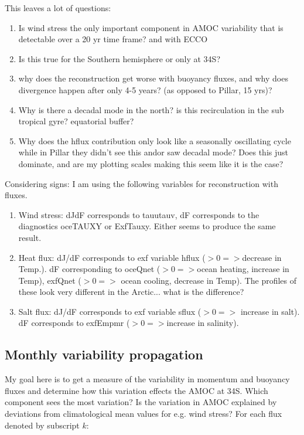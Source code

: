 \documentclass[a4paper,11pt]{article}
\begin{document}
  This leaves a lot of questions: 
  \begin{enumerate}
	\item Is wind stress the only important component in AMOC variability that is detectable over a 20 yr time frame? and with ECCO
	\item Is this true for the Southern hemisphere or only at 34S? 
	\item why does the reconstruction get worse with buoyancy fluxes, and why does divergence happen after only 4-5 years? (as opposed to Pillar, 15 yrs)?
	\item Why is there a decadal mode in the north? is this recirculation in the sub tropical gyre? equatorial buffer? 
	\item Why does the hflux contribution only look like a seasonally oscillating cycle while in Pillar they didn't see this andor saw decadal mode? Does this just dominate, and are my plotting scales making this seem like it is the case? 
 \end{enumerate}

  Considering signs: I am using the following variables for reconstruction with fluxes. 
  \begin{enumerate}
	\item Wind stress: dJdF corresponds to tauutauv, dF corresponds to the diagnostics oceTAUXY or ExfTauxy. Either seems to produce the same result. 
	\item Heat flux: dJ/dF corresponds to exf variable hflux ($>0 => $decrease in Temp.). dF corresponding to oceQnet ($>0 => $ocean heating, increase in Temp), exfQnet ($>0 =>$ ocean cooling, decrease in Temp). The profiles of these look very different in the Arctic... what is the difference? 
	\item Salt flux: dJ/dF corresponds to exf variable sflux ($>0 =>$ increase in salt). dF corresponds to exfEmpmr ($>0 => $increase in salinity). 
  \end{enumerate}

  \subsection{Monthly variability propagation}

  My goal here is to get a measure of the variability in momentum and buoyancy fluxes and determine how this variation effects the AMOC at 34S. Which component sees the most variation? Is the variation in AMOC explained by deviations from climatological mean values for e.g. wind stress? For each flux denoted by subscript $k$:
\end{document}

